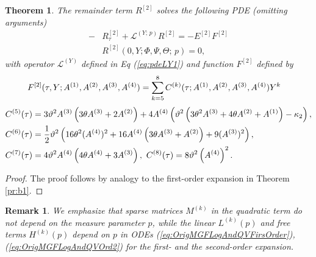 \documentclass[pdftex,11pt,a4paper] {article}
\newtheorem{theorem}{Theorem}[section]
\newtheorem*{remark}{Remark}%
\begin{document}
\begin{theorem}
The remainder term $R^{[2]}$ solves the following PDE (omitting arguments)
\begin{equation}\label{eq:OrigMGFLogAndQVOrd2Rem1}
\begin{split}
 -&R^{[2]}_\tau +  \mathcal{L}^{(Y;\,p)} R^{[2]}=-E^{[2]}F^{[2]}\\
&R^{[2]}(0,Y; \Phi,\Psi,\Theta;\,p)=0,
\end{split}
\end{equation}
with operator $\mathcal{L}^{(Y)}$ defined in Eq (\ref{eq:pdeLY1}) and function $F^{[2]}$ defined by
\begin{equation}\label{eq:OrigMGFLogAndQVOrd2Rem2Coeffs}
\begin{split}
&F^{[2]}(\tau,Y;A^{(1)},A^{(2)},A^{(3)},A^{(4)})=\sum_{k=5}^8 C^{(k)}(\tau;A^{(1)},A^{(2)},A^{(3)},A^{(4)})Y^k\vspace*{-1\baselineskip}
\end{split}
\end{equation}\vspace*{-1\baselineskip}
\begin{equation*}
\begin{split}
C^{(5)}(\tau) &=3 \vartheta ^2 A^{(3)} \left(3 \theta A^{(3)}+2 A^{(2)}\right)+4 A^{(4)} \left(\vartheta ^2 \left(3\theta^2 A^{(3)}+4 \theta A^{(2)}+A^{(1)}\right)-\kappa_2\right) ,\\
C^{(6)}(\tau) &=\frac{1}{2} \vartheta ^2 \left(16 \theta^2 (A^{(4)})^2+16 A^{(4)} \left(3 \theta A^{(3)}+A^{(2)}\right)+9 (A^{(3)})^2\right) ,\\
C^{(7)}(\tau) &=4 \vartheta ^2 A^{(4)} \left(4 \theta A^{(4)}+3 A^{(3)}\right),\ C^{(8)}(\tau) = 8 \vartheta ^2 \left(A^{(4)}\right)^2.\vspace*{-1\baselineskip} 
\end{split}
\end{equation*}
\end{theorem}
\begin{proof}
The proof follows by analogy to the first-order expansion in Theorem \ref{pr:b1}.
\end{proof}

\begin{remark}
We emphasize that sparse matrices $M^{(k)}$ in the quadratic term  do not depend on the measure parameter $p$, while the linear $L^{(k)}(p)$ and free terms $H^{(k)}(p)$ depend on $p$ in ODEs (\ref{eq:OrigMGFLogAndQVFirsOrder}), (\ref{eq:OrigMGFLogAndQVOrd2}) for the first- and the second-order expansion.
\end{remark}
\end{document}
